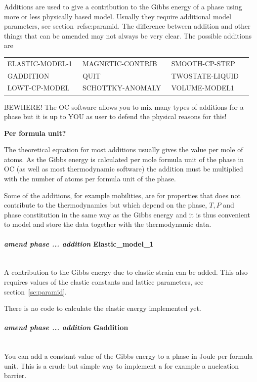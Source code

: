 \documentclass[11pt]{article}
\newcommand{\subsubsubsection}[1]{\paragraph{#1}\mbox{}\\}
\begin{document}
Additions are used to give a contribution to the Gibbs energy of a
phase using more or less physically based model.  Usually they require
additional model parameters, see section~ref{sc:paramid}.  The
difference between addition and other things that can be amended may
not always be very clear.  The possible additions are

{\small
\begin{tabular}{llll}
 ELASTIC-MODEL-1~ & MAGNETIC-CONTRIB~ & SMOOTH-CP-STEP \\
 GADDITION        & QUIT              & TWOSTATE-LIQUID\\
 LOWT-CP-MODEL    & SCHOTTKY-ANOMALY~ & VOLUME-MODEL1\\
\end{tabular}
}

BEWHERE! The OC software allows you to mix many types of additions for
a phase but it is up to YOU as user to defend the physical reasons for
this!

\hypertarget{Add per formula unit}{{\bf Per formula unit?}}

The theoretical equation for most additions usually gives the value
per mole of atoms.  As the Gibbs energy is calculated per mole formula
unit of the phase in OC (as well as most thermodynamic software) the
addition must be multiplied with the number of atoms per formula unit
of the phase.

Some of the additions, for example mobilities, are for properties that
does not contribute to the thermodynamics but which depend on the
phase, $T, P$ and phase constitution in the same way as the Gibbs
energy and it is thus convenient to model and store the data together
with the thermodynamic data.


\hypertarget{Amend elastic-model-1}{}
\subsubsubsection{{\em amend phase ... addition} Elastic\_model\_1}

A contribution to the Gibbs energy due to elastic strain can be added.
This also requires values of the elastic constants and lattice
parameters, see section~\ref{sc:paramid}.  

There is no code to calculate the elastic energy implemented yet.

\hypertarget{Amend Gaddition}{}
\subsubsubsection{{\em amend phase ... addition} Gaddition}

You can add a constant value of the Gibbs energy to a phase in Joule
per formula unit.  This is a crude but simple way to implement a for
example a nucleation barrier.
\end{document}

